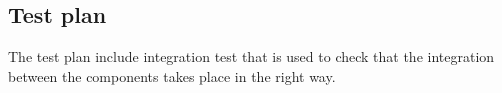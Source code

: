 \subsection{Test plan}
The test plan include integration test that is used to check that the integration between the components takes place in the right way.